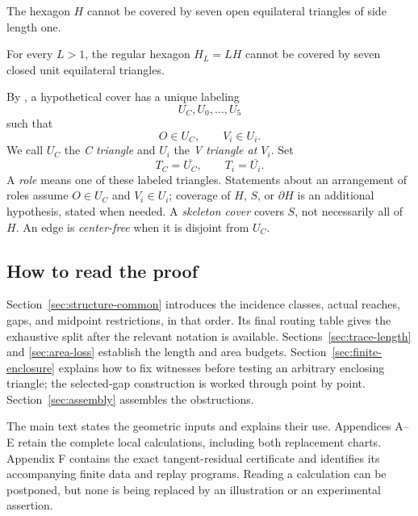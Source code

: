 \begin{theorem}
\label{thm:main}
The hexagon $H$ cannot be covered by seven open equilateral triangles of side
length one.
\end{theorem}

\begin{corollary}
\label{cor:expanded-closed}
For every $L>1$, the regular hexagon $H_L=LH$ cannot be covered by seven closed
unit equilateral triangles.
\end{corollary}

By , a hypothetical cover has a unique
labeling
\[
 U_C,U_0,\ldots,U_5
\]
such that
\[
 O\in U_C,
 \qquad
 V_i\in U_i.
\]
We call $U_C$ the \emph{C triangle} and $U_i$ the \emph{V triangle at
$V_i$}.  Set
\[
 T_C=\overline{U_C},\qquad T_i=\overline{U_i}.
\]
A \emph{role} means one of these labeled triangles. Statements about an
arrangement of roles assume $O\in U_C$ and $V_i\in U_i$; coverage of
$H$, $S$, or $\partial H$ is an additional hypothesis, stated when needed.
A \emph{skeleton cover} covers $S$, not necessarily all of $H$.
An edge is \emph{center-free} when it is disjoint from $U_C$.





\subsection{How to read the proof}
Section~\ref{sec:structure-common} introduces the incidence classes, actual
reaches, gaps, and midpoint restrictions, in that order. Its final routing
table gives the exhaustive split after the relevant notation is available.
Sections~\ref{sec:trace-length} and \ref{sec:area-loss} establish the length
and area budgets. Section~\ref{sec:finite-enclosure} explains how to fix
witnesses before testing an arbitrary enclosing triangle; the selected-gap
construction is worked through point by point. Section~\ref{sec:assembly}
assembles the obstructions.

The main text states the geometric inputs and explains their use.
Appendices A--E retain the complete local calculations, including both
replacement charts. Appendix F contains the exact tangent-residual
certificate and identifies its accompanying finite data and replay programs.
Reading a calculation can be postponed, but none is being replaced by an
illustration or an experimental assertion.
